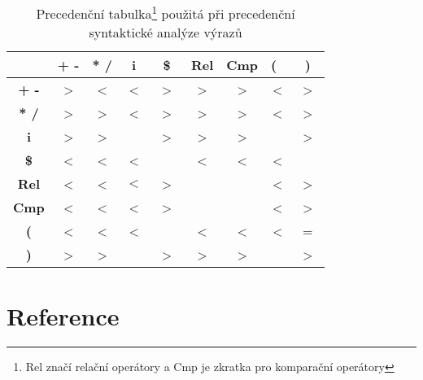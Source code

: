 \documentclass[a4paper,12pt]{article}
\begin{document}
\begin{table}[h]
	\centering
	\begin{tabular}{|c|c|c|c|c|c|c|c|c|} 
		\hline
		                      & \textbf{+ -}   & \textbf{* /}   & \textbf{i}  & \textbf{~\$~}  & \textbf{Rel}   & \textbf{Cmp}   & \textbf{(}~ & \textbf{~)~}   \\ 
		\hline
		\textbf{\textbf{+ -}} & \textgreater{} & \textless{}    & \textless{} & \textgreater{} & \textgreater{} & \textgreater{} & \textless{} & \textgreater{} \\ 
		\hline
		\textbf{\textbf{* /}} & \textgreater{} & \textgreater{} & \textless{} & \textgreater{} & \textgreater{} & \textgreater{} & \textless{} & \textgreater{} \\ 
		\hline
		\textbf{\textbf{i}}   & \textgreater{} & \textgreater{} &             & \textgreater{} & \textgreater{} & \textgreater{} &             & \textgreater{} \\ 
		\hline
		\textbf{\textbf{\$}}  & \textless{}    & \textless{}    & \textless{} &                & \textless{}    & \textless{}    & \textless{} &                \\ 
		\hline
		\textbf{\textbf{Rel}} & \textless{}    & \textless{}    & $<$         & \textgreater{} &                &                & \textless{} & \textgreater{} \\ 
		\hline
		\textbf{\textbf{Cmp}} & \textless{}    & \textless{}    & \textless{} & \textgreater{} &                &                & \textless{} & \textgreater{} \\ 
		\hline
		\textbf{\textbf{(}}   & \textless{}    & \textless{}    & \textless{} &                & \textless{}    & \textless{}    & \textless{} & =              \\ 
		\hline
		\textbf{\textbf{)}}   & \textgreater{} & \textgreater{} &             & \textgreater{} & \textgreater{} & \textgreater{} &             & \textgreater{} \\
		\hline
	\end{tabular}
	\begin{minipage}{\textwidth}
		\vspace{1.5em}
		\caption{Precedenční tabulka\protect\footnote[3]{Rel značí relační operátory a Cmp je zkratka pro komparační operátory} použitá při precedenční syntaktické analýze výrazů}
		\label{table:prec_table}
	\end{minipage}
\end{table}
\clearpage

\section{Reference}
\nocite{*}
\printbibliography[heading=none]
\end{document}
